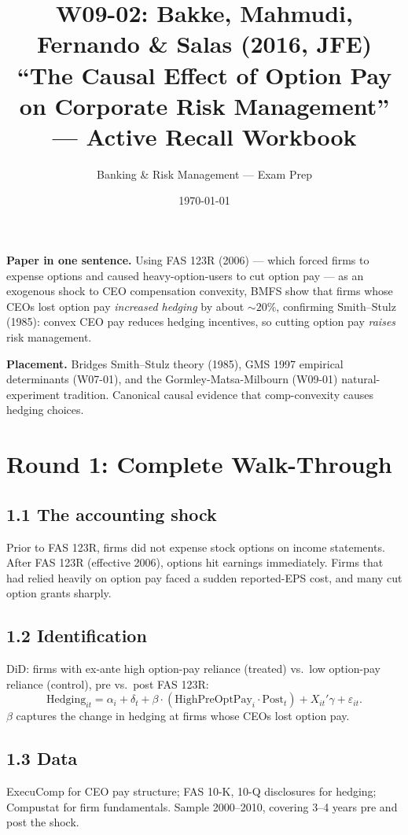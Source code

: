 \documentclass[11pt]{article}
\title{W09-02: Bakke, Mahmudi, Fernando \& Salas (2016, JFE) \\
\large ``The Causal Effect of Option Pay on Corporate Risk Management'' --- Active Recall Workbook}
\author{Banking \& Risk Management --- Exam Prep}
\date{\today}
\begin{document}
\maketitle

\begin{keybox}
\textbf{Paper in one sentence.} Using FAS 123R (2006) --- which forced firms to expense options and caused heavy-option-users to cut option pay --- as an exogenous shock to CEO compensation convexity, BMFS show that firms whose CEOs lost option pay \emph{increased hedging} by about $\sim 20\%$, confirming Smith--Stulz (1985): convex CEO pay reduces hedging incentives, so cutting option pay \emph{raises} risk management.

\textbf{Placement.} Bridges Smith--Stulz theory (1985), GMS 1997 empirical determinants (W07-01), and the Gormley-Matsa-Milbourn (W09-01) natural-experiment tradition. Canonical causal evidence that comp-convexity causes hedging choices.
\end{keybox}

\section*{Round 1: Complete Walk-Through}

\subsection*{1.1 The accounting shock}
Prior to FAS 123R, firms did not expense stock options on income statements. After FAS 123R (effective 2006), options hit earnings immediately. Firms that had relied heavily on option pay faced a sudden reported-EPS cost, and many cut option grants sharply.

\subsection*{1.2 Identification}
DiD: firms with ex-ante high option-pay reliance (treated) vs.\ low option-pay reliance (control), pre vs.\ post FAS 123R:
\[
\text{Hedging}_{it}=\alpha_i+\delta_t+\beta\cdot(\text{HighPreOptPay}_i\cdot\text{Post}_t)+X_{it}'\gamma+\varepsilon_{it}.
\]
$\beta$ captures the change in hedging at firms whose CEOs lost option pay.

\subsection*{1.3 Data}
ExecuComp for CEO pay structure; FAS 10-K, 10-Q disclosures for hedging; Compustat for firm fundamentals. Sample 2000--2010, covering 3--4 years pre and post the shock.
\end{document}
